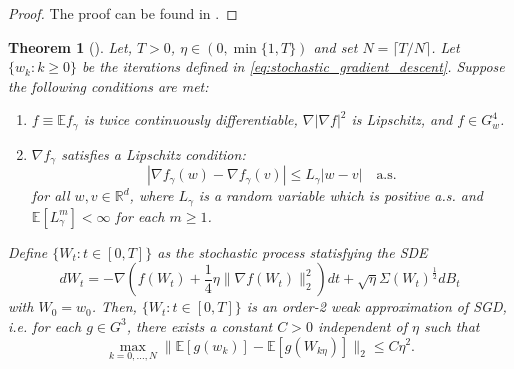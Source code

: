 \documentclass[12pt]{article}
\newtheorem{theorem}{Theorem}[section]
\theoremstyle{definition}
\numberwithin{equation}{section}
\newcommand{\R}{\mathbb{R}}
\newcommand{\E}{\mathbb{E}}
\newcommand{\ev}[1]{\mathbb{E}\left[{#1}\right]}
\newcommand{\norm}[1]{\lVert{#1}\rVert_2}
\begin{document}
\begin{proof}
  The proof can be found in \cite[Lemma 29]{liStochasticModifiedEquations2019}.
\end{proof}
\begin{theorem}[\autocite{liStochasticModifiedEquations2019}]
  \label{thm:second_order}
  Let, $T > 0$, $\eta \in (0, \min\{1,T\})$ and set $N = \lceil T/N \rceil$. Let $\{w_k:k\geq 0\}$ be the iterations defined in \eqref{eq:stochastic_gradient_descent}. Suppose the following conditions are met:
  \begin{enumerate}[label=(\roman*)]
    \item $f \equiv \E f_{\gamma}$ is twice continuously differentiable, $\nabla |\nabla f |^2$ is Lipschitz, and $f \in G^4_w$.
    \item $\nabla f_{\gamma}$ satisfies a Lipschitz condition:
    \begin{equation*}
      |\nabla f_{\gamma}(w) - \nabla f_{\gamma}(v)| \leq L_{\gamma} |w - v| \quad \text{a.s.}
    \end{equation*}
    for all $w,v \in \R^d$, where $L_{\gamma}$ is a random variable which is positive a.s. and $\ev{L_{\gamma}^m} < \infty$ for each $m \geq 1$.
  \end{enumerate}
  Define $\{W_t:t\in [0,T] \}$ as the stochastic process statisfying the SDE
  \begin{equation}
    \label{eq:second_order_sde}
    d W_t = -\nabla\left(f(W_t) + \frac{1}{4}\eta \norm{\nabla f(W_t)}^2\right)dt + \sqrt{\eta}\Sigma(W_t)^{\frac{1}{2}}dB_t
  \end{equation}
  with $W_0 = w_0$. Then, $\{W_t:t\in [0,T] \}$ is an order-2 weak approximation of SGD, i.e. for each $g \in G^3$, there exists a constant $C > 0$ independent of $\eta$ such that
  \begin{equation}
    \max_{k=0,\dots,N} \norm{\ev{g(w_k)} - \ev{g(W_{k\eta})}} \leq C \eta^2.
  \end{equation}
\end{theorem}
\end{document}

